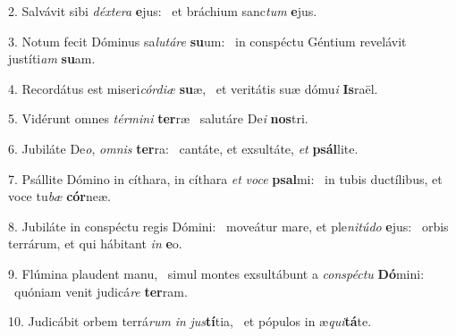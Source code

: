 2. Salvávit sibi \textit{déx}\textit{te}\textit{ra} \textbf{e}jus: \ast\  et bráchium sanc\textit{tum} \textbf{e}jus.\

3. Notum fecit Dóminus sa\textit{lu}\textit{tá}\textit{re} \textbf{su}um: \ast\  in conspéctu Géntium revelávit justíti\textit{am} \textbf{su}am.\

4. Recordátus est miseri\textit{cór}\textit{di}\textit{æ} \textbf{su}æ, \ast\  et veritátis suæ dómu\textit{i} \textbf{Is}raël.\

5. Vidérunt omnes \textit{tér}\textit{mi}\textit{ni} \textbf{ter}ræ \ast\  salutáre De\textit{i} \textbf{nos}tri.\

6. Jubiláte De\textit{o}, \textit{om}\textit{nis} \textbf{ter}ra: \ast\  cantáte, et exsultáte, \textit{et} \textbf{psál}lite.\

7. Psállite Dómino in cíthara, in cíthara \textit{et} \textit{vo}\textit{ce} \textbf{psal}mi: \ast\  in tubis ductílibus, et voce tu\textit{bæ} \textbf{cór}neæ.\

8. Jubiláte in conspéctu regis Dómini: \dag\  moveátur mare, et ple\textit{ni}\textit{tú}\textit{do} \textbf{e}jus: \ast\  orbis terrárum, et qui hábitant \textit{in} \textbf{e}o.\

9. Flúmina plaudent manu, \dag\  simul montes exsultábunt a \textit{con}\textit{spéc}\textit{tu} \textbf{Dó}mini: \ast\  quóniam venit judicá\textit{re} \textbf{ter}ram.\

10. Judicábit orbem terrá\textit{rum} \textit{in} \textit{jus}\textbf{tí}tia, \ast\  et pópulos in æ\textit{qui}\textbf{tá}te.\

